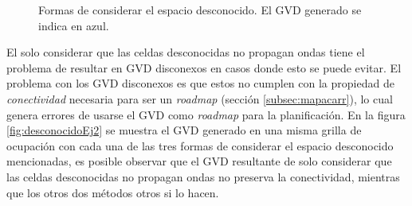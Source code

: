 \begin{figure}[H]
  \centerfloat

  \quad

  \caption[Formas de considerar el espacio desconocido.]{Formas de considerar el espacio desconocido. El GVD generado se indica en azul.}\label{fig:desconocidoEj1}
\end{figure}


El solo considerar que las celdas desconocidas no propagan ondas tiene el
problema de resultar en GVD disconexos en casos donde esto se puede evitar. El
problema con los GVD disconexos es que estos no cumplen con la propiedad de
\emph{conectividad} necesaria para ser un \emph{roadmap} (sección
\ref{subsec:mapacarr}), lo cual genera errores de usarse el GVD como
\emph{roadmap} para la planificación. En la figura \ref{fig:desconocidoEj2} se
muestra el GVD generado en una misma grilla de ocupación con cada una de las
tres formas de considerar el espacio desconocido mencionadas, es posible
observar que el GVD resultante de solo considerar que las celdas desconocidas
no propagan ondas no preserva la conectividad, mientras que los otros dos
métodos otros si lo hacen.

